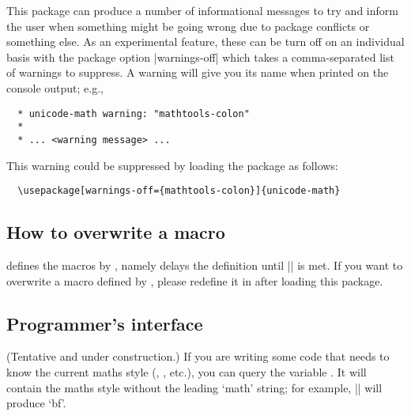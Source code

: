 This package can produce a number of informational messages to try and inform the user when something might be going wrong due to package conflicts or something else.
As an experimental feature, these can be turn off on an individual basis with the package option |warnings-off| which takes a comma-separated list of warnings to suppress.
A warning will give you its name when printed on the console output; e.g.,
\begin{Verbatim}
  * unicode-math warning: "mathtools-colon"
  *
  * ... <warning message> ...
\end{Verbatim}
This warning could be suppressed by loading the package as follows:
\begin{Verbatim}
  \usepackage[warnings-off={mathtools-colon}]{unicode-math}
\end{Verbatim}

\subsection{How to overwrite a macro}

 defines the macros by ,
namely delays the definition until || is met.
If you want to overwrite a macro defined by ,
please redefine it in  after loading this package.

\subsection{Programmer's interface}

(Tentative and under construction.)
If you are writing some code that needs to know the current
maths style (, , etc.), you can query the
variable . It will contain the maths style
without the leading `math' string; for example,
||
will produce `bf'.

\endinput

%
%

